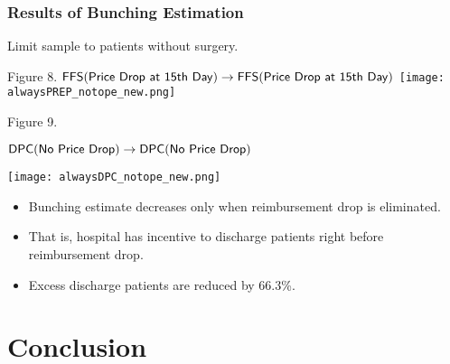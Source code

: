 \documentclass[14pt]{beamer}
\begin{document}
\begin{frame}[allowframebreaks]
\frametitle{Results of Bunching Estimation}
Limit sample to patients without surgery.\par
\vspace{5pt}

\framebreak

\begin{center}
{\small Figure 8. ${\sf FFS(Price\ Drop\ at\ 15th\ Day)} \rightarrow {\sf FFS(Price\ Drop\ at\ 15th\ Day)}$}
\texttt{[image: alwaysPREP\_notope\_new.png]}
\end{center}

\framebreak

\begin{center}
{\small Figure 9.\par ${\sf DPC(No\ Price\ Drop)} \rightarrow {\sf DPC(No\ Price\ Drop)}$}
\texttt{[image: alwaysDPC\_notope\_new.png]}
\end{center}

\framebreak

\begin{itemize}
\item Bunching estimate decreases only when reimbursement drop is eliminated.
\item That is, hospital has incentive to discharge patients right before reimbursement drop.
\item Excess discharge patients are reduced by 66.3\%.
\end{itemize}

\end{frame}

\section{Conclusion}
\end{document}

